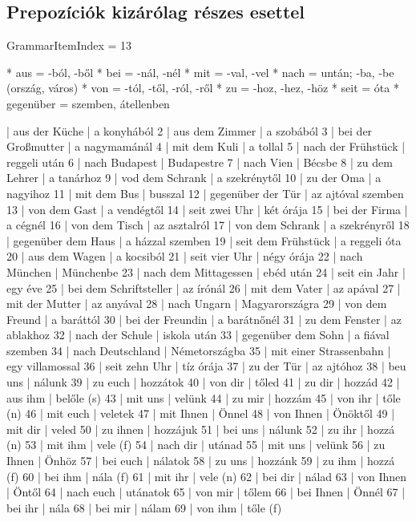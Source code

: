 \documentclass{article}
\newenvironment{desc}{\verbatim}{\endverbatim}
\newenvironment{exmp}{\verbatim}{\endverbatim}
\begin{document}
\subsection{Prepozíciók kizárólag részes esettel}

GrammarItemIndex = 13

\begin{desc}
* aus = -ból, -ből
* bei = -nál, -nél
* mit = -val, -vel
* nach = untán; -ba, -be (ország, város)
* von = -tól, -től, -ról, -ről
* zu = -hoz, -hez, -höz
* seit = óta
* gegenüber = szemben, átellenben
\end{desc}

\begin{exmp}
1 | aus der Küche | a konyhából
2 | aus dem Zimmer | a szobából
3 | bei der Großmutter | a nagymamánál
4 | mit dem Kuli | a tollal
5 | nach der Frühstück | reggeli után
6 | nach Budapest | Budapestre
7 | nach Vien | Bécsbe
8 | zu dem Lehrer | a tanárhoz
9 | vod dem Schrank | a szekrénytől
10 | zu der Oma | a nagyihoz
11 | mit dem Bus | busszal
12 | gegenüber der Tür | az ajtóval szemben
13 | von dem Gast | a vendégtől
14 | seit zwei Uhr | két órája
15 | bei der Firma | a cégnél
16 | von dem Tisch | az asztalról
17 | von dem Schrank | a szekrényről
18 | gegenüber dem Haus | a házzal szemben
19 | seit dem Frühstück | a reggeli óta
20 | aus dem Wagen | a kocsiból
21 | seit vier Uhr | négy órája
22 | nach München | Münchenbe
23 | nach dem Mittagessen | ebéd után
24 | seit ein Jahr | egy éve
25 | bei dem Schriftsteller | az írónál
26 | mit dem Vater | az apával
27 | mit der Mutter | az anyával
28 | nach Ungarn | Magyarországra
29 | von dem Freund | a baráttól
30 | bei der Freundin | a barátnőnél
31 | zu dem Fenster | az ablakhoz
32 | nach der Schule | iskola után
33 | gegenüber dem Sohn | a fiával szemben
34 | nach Deutschland | Németországba
35 | mit einer Strassenbahn | egy villamossal
36 | seit zehn Uhr | tíz órája
37 | zu der Tür | az ajtóhoz
38 | beu uns | nálunk
39 | zu euch | hozzátok
40 | von dir | tőled
41 | zu dir | hozzád
42 | aus ihm | belőle (s)
43 | mit uns | velünk
44 | zu mir | hozzám
45 | von ihr | tőle (n)
46 | mit euch | veletek
47 | mit Ihnen | Önnel
48 | von Ihnen | Önöktől
49 | mit dir | veled
50 | zu ihnen | hozzájuk
51 | bei uns | nálunk
52 | zu ihr | hozzá (n)
53 | mit ihm | vele (f)
54 | nach dir | utánad
55 | mit uns | velünk
56 | zu Ihnen | Önhöz
57 | bei euch | nálatok
58 | zu uns | hozzánk
59 | zu ihm | hozzá (f)
60 | bei ihm | nála (f)
61 | mit ihr | vele (n)
62 | bei dir | nálad
63 | von Ihnen | Öntől
64 | nach euch | utánatok
65 | von mir | tőlem
66 | bei Ihnen | Önnél
67 | bei ihr | nála
68 | bei mir | nálam
69 | von ihm | tőle (f)
\end{exmp}
\end{document}
